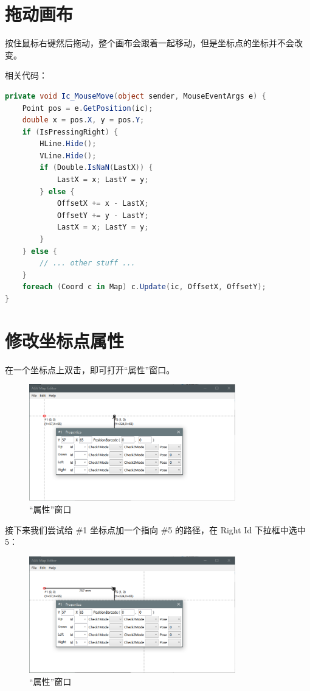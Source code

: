 \section{拖动画布}

按住鼠标右键然后拖动，整个画布会跟着一起移动，但是坐标点的坐标并不会改变。

相关代码：

\begin{lstlisting}[language=cs]
private void Ic_MouseMove(object sender, MouseEventArgs e) {
    Point pos = e.GetPosition(ic);
    double x = pos.X, y = pos.Y;
    if (IsPressingRight) {
        HLine.Hide();
        VLine.Hide();
        if (Double.IsNaN(LastX)) {
            LastX = x; LastY = y;
        } else {
            OffsetX += x - LastX;
            OffsetY += y - LastY;
            LastX = x; LastY = y;
        }
    } else {
        // ... other stuff ...
    }
    foreach (Coord c in Map) c.Update(ic, OffsetX, OffsetY);
}
\end{lstlisting}

\section{修改坐标点属性}

在一个坐标点上双击，即可打开``属性''窗口。

\begin{figure}[H]
  \centering
  \includegraphics[width=0.8\textwidth]{assets/prop.png}
  \caption{``属性''窗口}
  \label{fig:prop}
\end{figure}

接下来我们尝试给 \#1 坐标点加一个指向 \#5 的路径，在 Right Id 下拉框中选中 5：

\begin{figure}[H]
  \centering
  \includegraphics[width=0.8\textwidth]{assets/prop2.png}
  \caption{``属性''窗口}
  \label{fig:prop2}
\end{figure}

